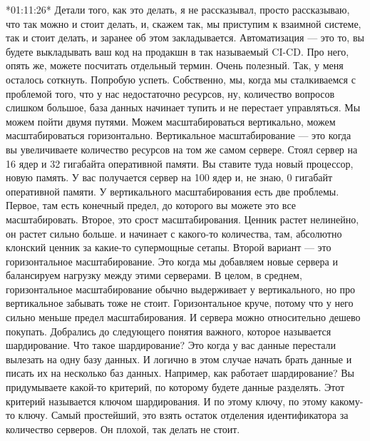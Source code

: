 \documentclass[12pt]{article} %
\begin{document}
*01:11:26*
Детали того, как это делать, я не рассказывал, просто рассказываю,  что так можно и стоит делать, и, скажем так, мы приступим к взаимной системе, так и стоит делать, и заранее об этом закладывается.  Автоматизация — это то, вы будете выкладывать ваш код на продакшн в так называемый CI-CD.  Про него, опять же, можете посчитать отдельный термин.  Очень полезный.  Так, у меня осталось соткнуть. Попробую успеть.  Собственно, мы, когда мы сталкиваемся с проблемой того, что у нас недостаточно ресурсов, ну, количество вопросов слишком большое, база данных начинает тупить и не перестает управляться.  Мы можем пойти двумя путями.  Можем масштабироваться вертикально, можем масштабироваться горизонтально.  Вертикальное масштабирование — это когда вы увеличиваете количество ресурсов на том же самом сервере.  Стоял сервер на 16 ядер и 32 гигабайта оперативной памяти.  Вы ставите туда новый процессор, новую память.  У вас получается сервер на 100 ядер и, не знаю, 0 гигабайт оперативной памяти.  У вертикального масштабирования есть две проблемы.  Первое, там есть конечный предел, до которого вы можете это все масштабировать.  Второе, это срост масштабирования.  Ценник растет нелинейно, он растет сильно больше.  и начинает с какого-то количества, там, абсолютно клонский ценник за какие-то супермощные сетапы.  Второй вариант — это горизонтальное масштабирование.  Это когда мы добавляем новые сервера и балансируем нагрузку между этими серверами.  В целом, в среднем, горизонтальное масштабирование обычно выдерживает у вертикального, но про вертикальное забывать тоже не стоит.  Горизонтальное круче, потому что у него сильно меньше предел масштабирования.  И сервера можно относительно дешево покупать.  Добрались до следующего понятия важного, которое называется шардирование.  Что такое шардирование?  Это когда у вас данные перестали вылезать на одну базу данных.  И логично в этом случае начать брать данные и писать их на несколько баз данных.  Например, как работает шардирование?  Вы придумываете какой-то критерий, по которому будете данные разделять.  Этот критерий называется ключом шардирования.  И по этому ключу, по этому какому-то ключу.  Самый простейший, это взять остаток отделения идентификатора за количество серверов.  Он плохой, так делать не стоит.
\end{document}
